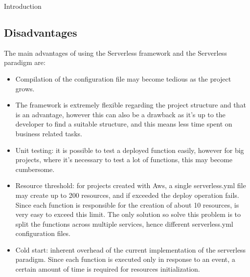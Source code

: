 \begin{chapter}{Introduction}
    \subsection{Disadvantages}
    \label{subsec:sls_disadvantage}
    The main advantages of using the Serverless framework and the Serverless paradigm are:
    \begin{itemize}
        \item Compilation of the configuration file may become tedious as the project grows.
        \item The framework is extremely flexible regarding the project structure and
            that is an advantage, however this can also be a drawback as it's up to the
            developer to find a suitable structure, and this means less time spent on
            business related tasks.
        \item Unit testing: it is possible to test a deployed function easily, however
            for big projects, where it's necessary to test a lot of functions, this may
            become cumbersome.
        \item Resource threshold: for projects created with Aws, a single
            serverless.yml file may create up to 200 resources, and if exceeded
            the deploy operation fails. Since each function is responsible for the
            creation of about 10 resources, is very easy to exceed this limit.
            The only solution so solve this problem is to split the functions across
            multiple services, hence different serverless.yml configuration files.
        \item Cold start: inherent overhead of the current implementation of the
            serverless paradigm. Since each function is executed only in response to
            an event, a certain amount of time is required for resources initialization.
    \end{itemize}


\end{chapter}
